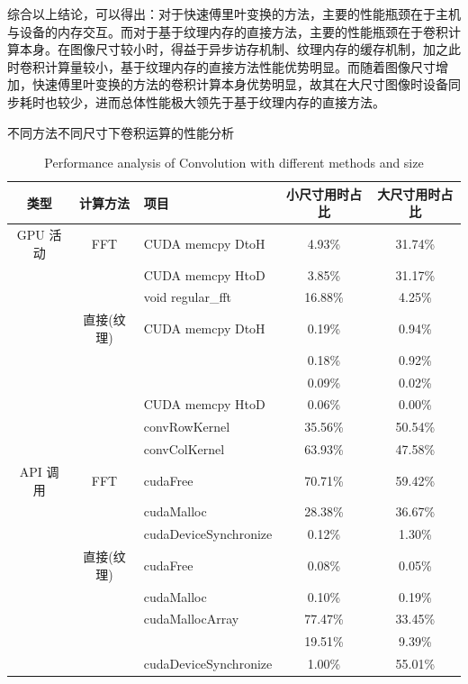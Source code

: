 \par 综合以上结论，可以得出：对于快速傅里叶变换的方法，主要的性能瓶颈在于主机与设备的内存交互。而对于基于纹理内存的直接方法，主要的性能瓶颈在于卷积计算本身。在图像尺寸较小时，得益于异步访存机制、纹理内存的缓存机制，加之此时卷积计算量较小，基于纹理内存的直接方法性能优势明显。而随着图像尺寸增加，快速傅里叶变换的方法的卷积计算本身优势明显，故其在大尺寸图像时设备同步耗时也较少，进而总体性能极大领先于基于纹理内存的直接方法。
\begin{table}
	\centering
	\renewcommand{\thetable}{\arabic{section}-\arabic{table} }
	\renewcommand{\tablename}{表}
	\caption{不同方法不同尺寸下卷积运算的性能分析}
	\addtocounter{table}{-1}
	\renewcommand{\thetable}{\arabic{section}-\arabic{table} }
	\renewcommand{\tablename}{Table}
	\caption{Performance analysis of Convolution with different methods and size}
	\begin{tabular}{cclcc}
		\toprule
		类型 & 计算方法 & 项目 & 小尺寸用时占比 & 大尺寸用时占比\\
		\midrule
		 GPU 活动& FFT & CUDA memcpy DtoH & 4.93\% & 31.74\%\\
		 &				&  CUDA memcpy HtoD & 3.85\% & 31.17\%\\
		 &				&  void regular\_fft & 16.88\% & 4.25\%\\
		 & 直接(纹理)&  CUDA memcpy DtoH & 0.19\% & 0.94\%\\
		 &				&  \color[rgb]{0.3,0.4,1.0}{CUDA memcpy HtoA} & 0.18\% & 0.92\%\\
		 &				&  \color[rgb]{0.3,0.4,1.0}{CUDA memcpy DtoA} & 0.09\% & 0.02\%\\
		 &				&  CUDA memcpy HtoD & 0.06\% & 0.00\%\\
		 &				&  convRowKernel & 35.56\% & 50.54\%\\
		 &				&  convColKernel & 63.93\% & 47.58\%\\
		\midrule
		API 调用 &FFT &cudaFree &70.71\% & 59.42\% \\
				  &				& cudaMalloc & 28.38\% & 36.67\%\\
				  &				& cudaDeviceSynchronize &0.12\% & 1.30\%\\
				  &直接(纹理)& cudaFree & 0.08\% & 0.05\%\\
				  &				& cudaMalloc & 0.10\% & 0.19\%\\
				  &				& cudaMallocArray & 77.47\% & 33.45\%\\
				  &			    & \color[rgb]{0.3,0.4,1.0}{cuDevicePrimaryCtxRelease} & 19.51\% & 9.39\%\\
				  &				& cudaDeviceSynchronize & 1.00\% & 55.01\% \\
		\bottomrule
	\end{tabular} \label{table-CONVPROF} 
\end{table}
